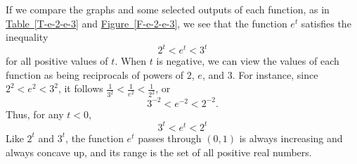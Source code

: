 \documentclass[nooutcomes]{ximera}
\begin{document}
If we compare the graphs and some selected outputs of each function, as in \hyperref[T-e-2-e-3]{Table~\ref{T-e-2-e-3}} and \hyperref[F-e-2-e-3]{Figure~\ref{F-e-2-e-3}}, we see that the function \(e^t\) satisfies the inequality%
\begin{equation*}
2^t \lt e^t \lt 3^t
\end{equation*}
for all positive values of \(t\).  When \(t\) is negative, we can view the values of each function as being reciprocals of powers of \(2\), \(e\), and \(3\).  For instance, since \(2^2 \lt e^2 \lt 3^2\), it follows \(\frac{1}{3^2} \lt \frac{1}{e^2} \lt \frac{1}{2^2}\), or%
\begin{equation*}
3^{-2} \lt e^{-2} \lt 2^{-2}\text{.}
\end{equation*}
Thus, for any \(t \lt 0\),%
\begin{equation*}
3^t \lt e^t \lt 2^t
\end{equation*}
Like \(2^t\) and \(3^t\), the function \(e^t\) passes through \((0,1)\) is always increasing and always concave up, and its range is the set of all positive real numbers.
\end{document}
